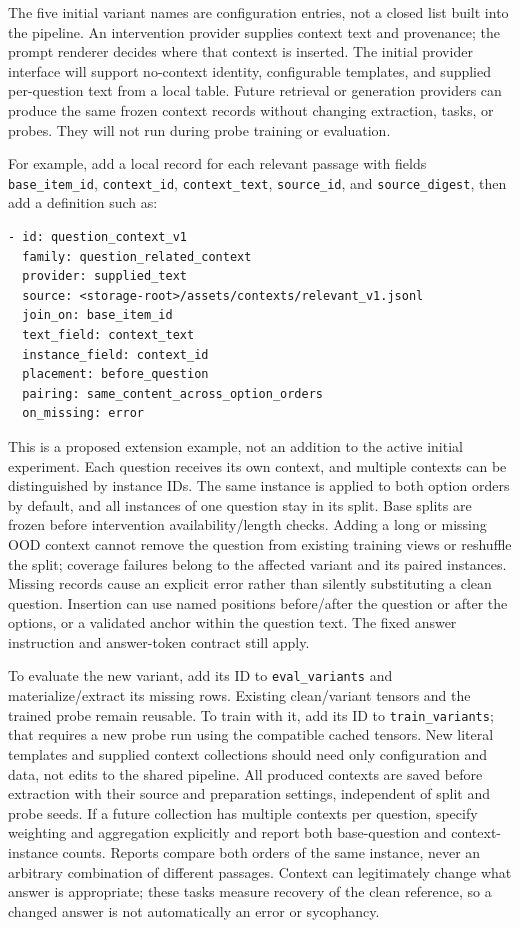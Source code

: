 \documentclass[11pt]{article}
\begin{document}
The five initial variant names are configuration entries, not a closed list built into the pipeline.
An intervention provider supplies context text and provenance; the prompt renderer decides where that context is inserted.
The initial provider interface will support no-context identity, configurable templates, and supplied per-question text from a local table.
Future retrieval or generation providers can produce the same frozen context records without changing extraction, tasks, or probes.
They will not run during probe training or evaluation.

For example, add a local record for each relevant passage with fields \texttt{base\_item\_id}, \texttt{context\_id}, \texttt{context\_text}, \texttt{source\_id}, and \texttt{source\_digest}, then add a definition such as:
\begin{verbatim}
- id: question_context_v1
  family: question_related_context
  provider: supplied_text
  source: <storage-root>/assets/contexts/relevant_v1.jsonl
  join_on: base_item_id
  text_field: context_text
  instance_field: context_id
  placement: before_question
  pairing: same_content_across_option_orders
  on_missing: error
\end{verbatim}
This is a proposed extension example, not an addition to the active initial experiment.
Each question receives its own context, and multiple contexts can be distinguished by instance IDs.
The same instance is applied to both option orders by default, and all instances of one question stay in its split.
Base splits are frozen before intervention availability/length checks.
Adding a long or missing OOD context cannot remove the question from existing training views or reshuffle the split; coverage failures belong to the affected variant and its paired instances.
Missing records cause an explicit error rather than silently substituting a clean question.
Insertion can use named positions before/after the question or after the options, or a validated anchor within the question text.
The fixed answer instruction and answer-token contract still apply.

To evaluate the new variant, add its ID to \texttt{eval\_variants} and materialize/extract its missing rows.
Existing clean/variant tensors and the trained probe remain reusable.
To train with it, add its ID to \texttt{train\_variants}; that requires a new probe run using the compatible cached tensors.
New literal templates and supplied context collections should need only configuration and data, not edits to the shared pipeline.
All produced contexts are saved before extraction with their source and preparation settings, independent of split and probe seeds.
If a future collection has multiple contexts per question, specify weighting and aggregation explicitly and report both base-question and context-instance counts.
Reports compare both orders of the same instance, never an arbitrary combination of different passages.
Context can legitimately change what answer is appropriate; these tasks measure recovery of the clean reference, so a changed answer is not automatically an error or sycophancy.
\end{document}
